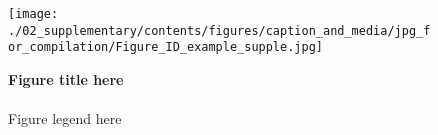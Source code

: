 
\begin{figure*}[p]
    \centering
    \texttt{[image: ./02\_supplementary/contents/figures/caption\_and\_media/jpg\_for\_compilation/Figure\_ID\_example\_supple.jpg]}
    \caption{
\textbf{
Figure title here
}
\smallskip
\\

\smallskip
\\
Figure legend here
}
    \label{fig:example_supple}
\end{figure*}

